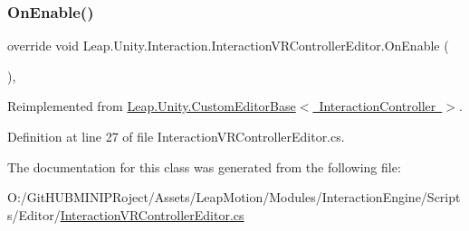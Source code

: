 \subsubsection{\texorpdfstring{OnEnable()}{OnEnable()}}
{\footnotesize\ttfamily override void Leap.\+Unity.\+Interaction.\+Interaction\+V\+R\+Controller\+Editor.\+On\+Enable (\begin{DoxyParamCaption}{ }\end{DoxyParamCaption})\hspace{0.3cm}{\ttfamily [protected]}, {\ttfamily [virtual]}}



Reimplemented from \mbox{\hyperlink{class_leap_1_1_unity_1_1_custom_editor_base_a2268bc01655342bd3da5ae015bfa2f93}{Leap.\+Unity.\+Custom\+Editor\+Base$<$ Interaction\+Controller $>$}}.



Definition at line 27 of file Interaction\+V\+R\+Controller\+Editor.\+cs.



The documentation for this class was generated from the following file\+:\begin{DoxyCompactItemize}
\item 
O\+:/\+Git\+H\+U\+B\+M\+I\+N\+I\+P\+Roject/\+Assets/\+Leap\+Motion/\+Modules/\+Interaction\+Engine/\+Scripts/\+Editor/\mbox{\hyperlink{_interaction_v_r_controller_editor_8cs}{Interaction\+V\+R\+Controller\+Editor.\+cs}}\end{DoxyCompactItemize}
